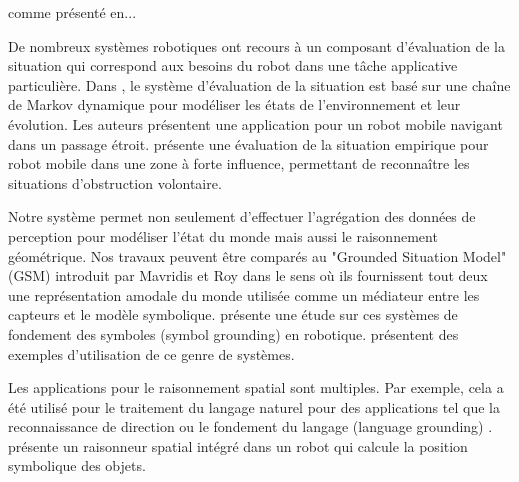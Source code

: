 \documentclass[a4paper,11pt,twoside]{StyleThese}
\begin{document}
comme présenté en...





De nombreux systèmes robotiques ont recours à un composant d'évaluation de la situation qui correspond aux besoins du robot dans une tâche applicative particulière. Dans \cite{beck2011}, le système d'évaluation de la situation est basé sur une chaîne de Markov dynamique pour modéliser les états de l'environnement et leur évolution. Les auteurs présentent une application pour un robot mobile navigant dans un passage étroit.
\cite{Kluge01situationassessment} présente une évaluation de la situation empirique pour robot mobile dans une zone à forte influence, permettant de reconnaître les situations d'obstruction volontaire.

Notre système permet non seulement d'effectuer l'agrégation des données de perception pour modéliser l'état du monde mais aussi le raisonnement géométrique. 
Nos travaux peuvent être comparés au "Grounded Situation Model" (GSM) introduit par Mavridis et Roy \cite{Mavridis2005} dans le sens où ils fournissent tout deux une représentation amodale du monde utilisée comme un médiateur entre les capteurs et le modèle symbolique. \cite{Coradeschi2013} présente une étude sur ces systèmes de fondement des symboles (symbol grounding) en robotique. \cite{Daoutis2009} \cite{Lemaignan2011}
présentent des exemples d'utilisation de ce genre de systèmes.

Les applications pour le raisonnement spatial \cite{OKeefe1999} sont multiples. Par exemple, cela a été utilisé pour le traitement du langage naturel pour des applications tel que la reconnaissance de direction \cite{Kollar10,Matuszek10}
ou le fondement du langage (language grounding) \cite{Tellex10}. \cite{Skubic2004} présente un raisonneur spatial intégré dans un robot qui calcule la position symbolique des objets.


\end{document}
